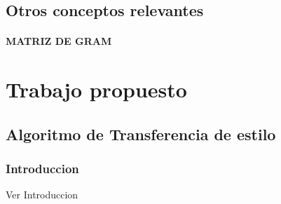 \documentclass[a4paper,10pt]{article}
\begin{document}
     \subsection {Otros conceptos relevantes}
	\paragraph{MATRIZ DE GRAM}
     
     
\section{Trabajo propuesto}
  \subsection{Algoritmo de Transferencia de estilo}
    \subsubsection{Introduccion}
    Ver Introduccion 
\end{document}
